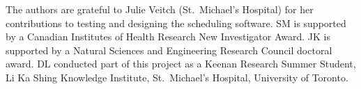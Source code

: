 The authors are grateful to Julie Veitch (St.\ Michael's Hospital) for her contributions to testing and
designing the scheduling software. SM is supported by a Canadian Institutes of
Health Research New Investigator Award. JK is supported by a Natural Sciences and 
Engineering Research Council doctoral award. DL conducted part of this project as a
Keenan Research Summer Student, Li Ka Shing Knowledge Institute, St.\ Michael's
Hospital, University of Toronto.
